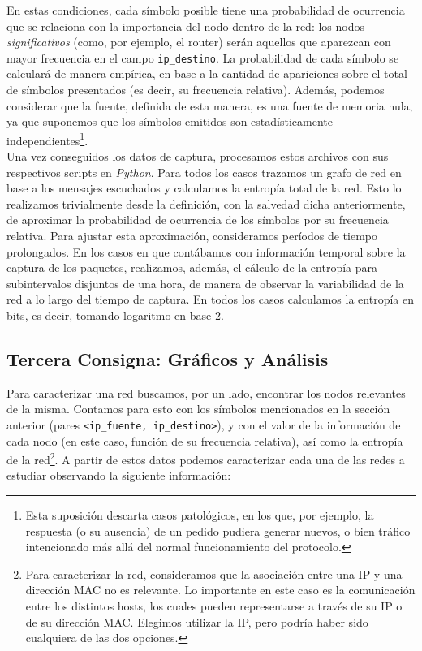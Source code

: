 En estas condiciones, cada s\'imbolo posible tiene una probabilidad de ocurrencia que se relaciona con la importancia del nodo dentro de la red: los nodos \emph{significativos} (como, por ejemplo, el router) ser\'an aquellos que aparezcan con mayor frecuencia en el campo \texttt{ip\_destino}. La probabilidad de cada s\'imbolo se calcular\'a de manera emp\'irica, en base a la cantidad de apariciones sobre el total de s\'imbolos presentados (es decir, su frecuencia relativa). Además, podemos considerar que la fuente, definida de esta manera, es una fuente de memoria nula, ya que suponemos que los s\'imbolos emitidos son estad\'isticamente independientes\footnote{Esta suposición descarta casos patológicos, en los que, por ejemplo, la respuesta (o su ausencia) de un pedido pudiera generar nuevos, o bien tráfico intencionado más allá del normal funcionamiento del protocolo.}.\\

Una vez conseguidos los datos de captura, procesamos estos archivos con sus respectivos scripts en \emph{Python}. Para todos los casos trazamos un grafo de red en base a los mensajes escuchados y calculamos la entropía total de la red. Esto lo realizamos trivialmente desde la definición, con la salvedad dicha anteriormente, de aproximar la probabilidad de ocurrencia de los símbolos por su frecuencia relativa. Para ajustar esta aproximación, consideramos períodos de tiempo prolongados. En los casos en que contábamos con información temporal sobre la captura de los paquetes, realizamos, además, el cálculo de la entropía para subintervalos disjuntos de una hora, de manera de observar la variabilidad de la red a lo largo del tiempo de captura. En todos los casos calculamos la entropía en bits, es decir, tomando logaritmo en base $2$.

\subsection{Tercera Consigna: Gr\'aficos y An\'alisis}

Para caracterizar una red buscamos, por un lado, encontrar los nodos relevantes de la misma. Contamos para esto con los s\'imbolos mencionados en la secci\'on anterior (pares \texttt{<ip\_fuente, ip\_destino>}), y con el valor de la informaci\'on de cada nodo (en este caso, función de su frecuencia relativa), así como la entrop\'ia de la red\footnote{Para caracterizar la red, consideramos que la asociaci\'on entre una IP y una direcci\'on MAC no es relevante. Lo importante en este caso es la comunicaci\'on entre los distintos hosts, los cuales pueden representarse a trav\'es de su IP o de su direcci\'on MAC. Elegimos utilizar la IP, pero podr\'ia haber sido cualquiera de las dos opciones.}. A partir de estos datos podemos caracterizar cada una de las redes a estudiar observando la siguiente informaci\'on:

